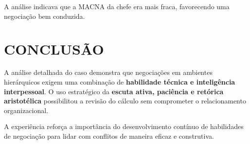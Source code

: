 \documentclass[article,12pt,oneside,a4paper]{article}
\begin{document}
A análise indicava que a MACNA da chefe era mais fraca, favorecendo uma negociação bem conduzida.
\section{CONCLUSÃO}
\label{sec:org4b3b248}
A análise detalhada do caso demonstra que negociações em ambientes hierárquicos exigem uma combinação de \textbf{habilidade técnica e inteligência interpessoal}. O uso estratégico da \textbf{escuta ativa, paciência e retórica aristotélica} possibilitou a revisão do cálculo sem comprometer o relacionamento organizacional.

A experiência reforça a importância do desenvolvimento contínuo de habilidades de negociação para lidar com conflitos de maneira eficaz e construtiva.

\renewcommand{\bibname}{REFERÊNCIAS}

\end{document}
